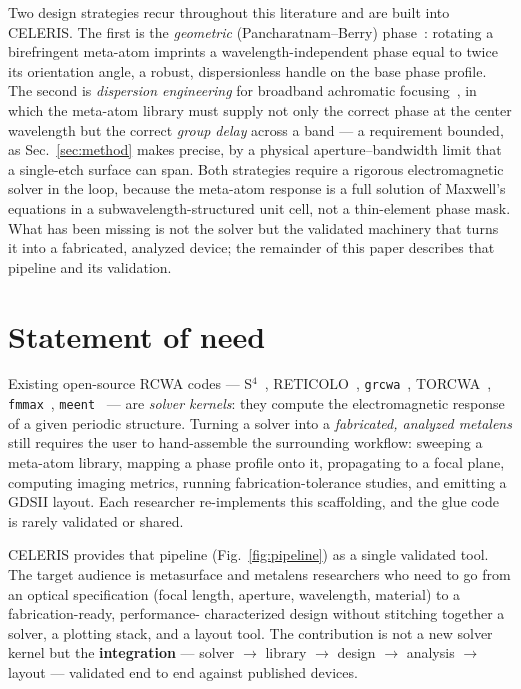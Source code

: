 \documentclass[preprint,12pt]{elsarticle}
\begin{document}
Two design strategies recur throughout this literature and are built into CELERIS.
The first is the \emph{geometric} (Pancharatnam--Berry) phase~\cite{berry1984,bomzon2002}:
rotating a birefringent meta-atom imprints a wavelength-independent phase equal to
twice its orientation angle, a robust, dispersionless handle on the base phase
profile. The second is \emph{dispersion engineering} for broadband achromatic
focusing~\cite{aieta2015,wang2018}, in which the meta-atom library must supply not
only the correct phase at the center wavelength but the correct \emph{group delay}
across a band --- a requirement bounded, as Sec.~\ref{sec:method} makes precise, by a
physical aperture--bandwidth limit that a single-etch surface can span. Both
strategies require a rigorous electromagnetic solver in the loop, because the
meta-atom response is a full solution of Maxwell's equations in a
subwavelength-structured unit cell, not a thin-element phase mask. What has been
missing is not the solver but the validated machinery that turns it into a
fabricated, analyzed device; the remainder of this paper describes that pipeline and
its validation.

\section{Statement of need}
Existing open-source RCWA codes --- S$^4$~\cite{liu2012s4}, RETICOLO~\cite{reticolo},
\texttt{grcwa}~\cite{grcwa}, TORCWA~\cite{torcwa}, \texttt{fmmax}~\cite{fmmax},
\texttt{meent}~\cite{meent} --- are \emph{solver kernels}: they compute the
electromagnetic response of a given periodic structure. Turning a solver into a
\emph{fabricated, analyzed metalens} still requires the user to hand-assemble the
surrounding workflow: sweeping a meta-atom library, mapping a phase profile onto it,
propagating to a focal plane, computing imaging metrics, running fabrication-tolerance
studies, and emitting a GDSII layout. Each researcher re-implements this scaffolding,
and the glue code is rarely validated or shared.

CELERIS provides that pipeline (Fig.~\ref{fig:pipeline}) as a single validated tool.
The target audience is
metasurface and metalens researchers who need to go from an optical specification
(focal length, aperture, wavelength, material) to a fabrication-ready, performance-
characterized design without stitching together a solver, a plotting stack, and a
layout tool. The contribution is not a new solver kernel but the \textbf{integration}
--- solver $\to$ library $\to$ design $\to$ analysis $\to$ layout --- validated
end to end against published devices.
\end{document}
